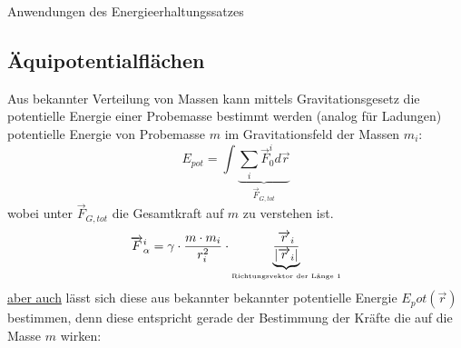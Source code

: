 \documentclass[a4paper,10pt]{scrartcl}
\begin{document}
\begin{seg}{Anwendungen des Energieerhaltungssatzes}
\begin{enumerate}[a)]
\subsection{Äquipotentialflächen}
Aus bekannter Verteilung von Massen kann mittels Gravitationsgesetz die potentielle Energie einer Probemasse bestimmt werden (analog für Ladungen) potentielle Energie von Probemasse $m$ im Gravitationsfeld der Massen $m_i$:
\[
 E_{pot}=\int\underbrace{\sum_i\vec F_0^id\vec{r}}_{\vec F_{G, tot}}
\]
wobei unter $\vec F_{G,tot}$ die Gesamtkraft auf $m$ zu verstehen ist.
\[
 \vec F_\alpha^i=\gamma\cdot \frac{m\cdot m_i}{r_i^2}\cdot\underbrace{\frac{\vec r_i}{|\vec r_i|}}_{\text{\tiny{Richtungsvektor der Länge $1$}}}
\]
\underline{aber auch} lässt sich diese aus bekannter bekannter potentielle Energie $E_pot(\vec r)$ bestimmen, denn diese entspricht gerade der Bestimmung der Kräfte die auf die Masse $m$ wirken:


\end{enumerate}
\end{seg}
\end{document}
